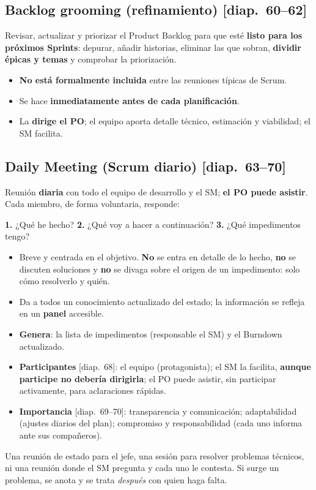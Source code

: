 \documentclass[11pt,a4paper,oneside,openany]{report}
\newcommand{\diap}[1]{\textcolor{mdaPrimary}{\small[diap.~#1]}}
\begin{document}
\subsection{Backlog grooming (refinamiento) \diap{60--62}}
Revisar, actualizar y priorizar el Product Backlog para que esté \textbf{listo para los próximos Sprints}: depurar,
añadir historias, eliminar las que sobran, \textbf{dividir épicas y temas} y comprobar la priorización.
\begin{itemize}[leftmargin=*,itemsep=1pt]
  \item \textbf{No está formalmente incluida} entre las reuniones típicas de Scrum.
  \item Se hace \textbf{inmediatamente antes de cada planificación}.
  \item La \textbf{dirige el PO}; el equipo aporta detalle técnico, estimación y viabilidad; el SM facilita.
\end{itemize}

\subsection{Daily Meeting (Scrum diario) \diap{63--70}}
Reunión \textbf{diaria} con todo el equipo de desarrollo y el SM; \textbf{el PO puede asistir}. Cada miembro, de forma
voluntaria, responde:
\begin{center}
\begin{tcolorbox}[colback=mdaLightGreen,colframe=mdaGreen,width=0.8\textwidth,halign=center]
\textbf{1.} ¿Qué he hecho? \quad \textbf{2.} ¿Qué voy a hacer a continuación? \quad \textbf{3.} ¿Qué impedimentos tengo?
\end{tcolorbox}
\end{center}
\begin{itemize}[leftmargin=*]
  \item Breve y centrada en el objetivo. \textbf{No} se entra en detalle de lo hecho, \textbf{no} se discuten soluciones y
        \textbf{no} se divaga sobre el origen de un impedimento: solo cómo resolverlo y quién.
  \item Da a todos un conocimiento actualizado del estado; la información se refleja en un \textbf{panel} accesible.
  \item \textbf{Genera}: la lista de impedimentos (responsable el SM) y el Burndown actualizado.
  \item \textbf{Participantes} \diap{68}: el equipo (protagonista); el SM la facilita, \textbf{aunque participe no
        debería dirigirla}; el PO puede asistir, sin participar activamente, para aclaraciones rápidas.
  \item \textbf{Importancia} \diap{69--70}: transparencia y comunicación; adaptabilidad (ajustes diarios del plan);
        compromiso y responsabilidad (cada uno informa ante sus compañeros).
\end{itemize}
\begin{aviso}[el Daily no es]
Una reunión de estado para el jefe, una sesión para resolver problemas técnicos, ni una reunión donde el SM pregunta
y cada uno le contesta. Si surge un problema, se anota y se trata \emph{después} con quien haga falta.
\end{aviso}
\end{document}
